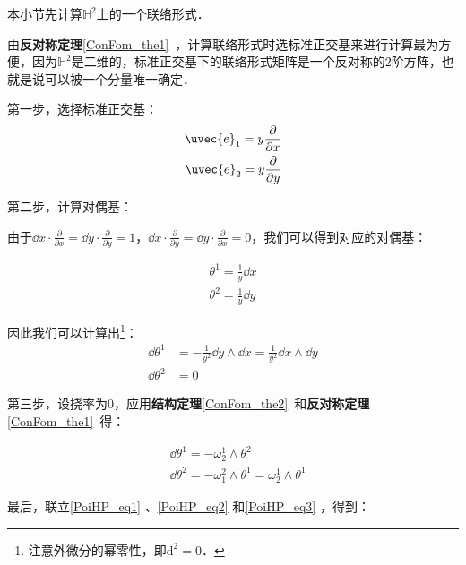 本小节先计算$\mathbb{H}^2$上的一个联络形式．

由\textbf{反对称定理}\autoref{ConFom_the1}~，计算联络形式时选标准正交基来进行计算最为方便，因为$\mathbb{H}^2$是二维的，标准正交基下的联络形式矩阵是一个反对称的$2$阶方阵，也就是说可以被一个分量唯一确定．

第一步，选择标准正交基：
\begin{equation}
\begin{aligned}
\uvec{e}_1=y\frac{\partial}{\partial x}\\
\uvec{e}_2=y\frac{\partial}{\partial y}
\end{aligned}
\end{equation}

第二步，计算对偶基：

由于$\dd x\cdot \frac{\partial }{\partial x}=\dd y\cdot \frac{\partial}{\partial y}=1$，$\dd x\cdot \frac{\partial }{\partial y}=\dd y\cdot \frac{\partial}{\partial x}=0$，我们可以得到对应的对偶基：

\begin{equation}\label{PoiHP_eq1}
\begin{aligned}
\theta^1=\frac{1}{y}\dd x\\
\theta^2=\frac{1}{y}\dd y
\end{aligned}
\end{equation}

因此我们可以计算出\footnote{注意外微分的幂零性，即$\mathrm{d}^2=0$．}：
\begin{equation}\label{PoiHP_eq2}
\begin{aligned}
\dd\theta^1&=-\frac{1}{y^2}\dd y\wedge\dd x=\frac{1}{y^2}\dd x\wedge \dd y\\
\dd\theta^2&=0
\end{aligned}
\end{equation}

第三步，设挠率为$0$，应用\textbf{结构定理}\autoref{ConFom_the2}~和\textbf{反对称定理}\autoref{ConFom_the1}~得：

\begin{equation}\label{PoiHP_eq3}
\begin{aligned}
&\dd\theta^1=-\omega^1_2\wedge\theta^2\\
&\dd\theta^2=-\omega^2_1\wedge\theta^1=\omega^1_2\wedge\theta^1
\end{aligned}
\end{equation}



最后，联立\autoref{PoiHP_eq1} 、\autoref{PoiHP_eq2} 和\autoref{PoiHP_eq3} ，得到：

